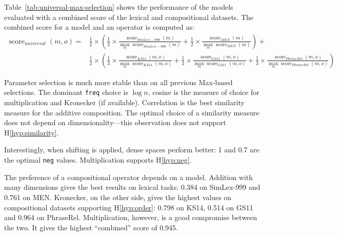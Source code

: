 Table~\ref{tab:universal-max-selection} shows the performance of the models evaluated with a combined score of the lexical and compositional datasets. The combined score for a model and an operator is computed as:
%
%
%
\scriptsize
\begin{align*}
\operatorname{score}_\mathit{universal}(\mathit{m}, \mathit{o}) = & %
\frac{1}{2}\times\left(
\frac{1}{2}\times%
\frac{\operatorname{score}_\mathit{SimLex-999}(\mathit{m})}%
{\max_m\operatorname{score}_\mathit{SimLex-999}(m)}%
+%
\frac{1}{2}\times%
\frac{\operatorname{score}_\mathit{MEN}(\mathit{m})}%
{\max_m\operatorname{score}_\mathit{MEN}(m)}%
\right) +
\\
&\frac{1}{2}\times\left(
\frac{1}{3}\times%
\frac{\operatorname{score}_\mathit{KS14}(\mathit{m}, \mathit{o})}%
{\max_m\operatorname{score}_\mathit{KS14}(m, \mathit{o})}%
+%
\frac{1}{3}\times%
\frac{\operatorname{score}_\mathit{GS11}(\mathit{m}, \mathit{o})}%
{\max_m\operatorname{score}_\mathit{GS11}(m, \mathit{o})}%
+%
\frac{1}{3}\times%
\frac{\operatorname{score}_\mathit{PhraseRel}(\mathit{m, \mathit{o}})}%
{\max_m\operatorname{score}_\mathit{PhraseRel}(m, \mathit{o})}%
\right)
\end{align*}
\normalsize

Parameter selection is much more stable than on all previous Max-based selections. The dominant \texttt{freq} choice is $\log n$, cosine is the measure of choice for multiplication and Kronecker (if available). Correlation is the best similarity measure for the additive composition. The optimal choice of a similarity measure does not depend on dimensionality---this observation does not support H\ref{hyp:similarity}.
%
%

Interestingly, when shifting is applied, dense spaces perform better: 1 and 0.7 are the optimal \texttt{neg} values. Multiplication  supports H\ref{hyp:neg}.

The preference of a compositional operator depends on a model. Addition with many dimensions gives the best results on lexical tasks: 0.384 on SimLex-999 and 0.761 on MEN. Kronecker, on the other side, gives the highest values on compositional datasets supporting H\ref{hyp:order}: 0.798 on KS14, 0.514 on GS11 and 0.964 on PhraseRel. Multiplication, however, is a good compromise between the two. It gives the highest ``combined'' score of 0.945.

